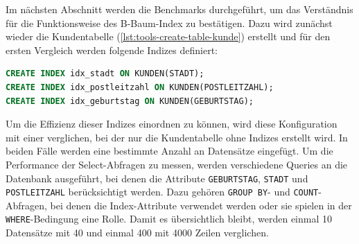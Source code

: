 Im nächsten Abschnitt werden die Benchmarks durchgeführt, um das Verständnis für die Funktionsweise des B-Baum-Index zu bestätigen.
Dazu wird zunächst wieder die Kundentabelle (\ref{lst:tools-create-table-kunde}) erstellt und für den ersten Vergleich werden folgende Indizes definiert:

\vspace{-5pt}
\begin{lstlisting}[language=SQL,caption=Definition mehrere Indizes,label={lst:indexing-create-multiple}]
CREATE INDEX idx_stadt ON KUNDEN(STADT);
CREATE INDEX idx_postleitzahl ON KUNDEN(POSTLEITZAHL);
CREATE INDEX idx_geburtstag ON KUNDEN(GEBURTSTAG);
\end{lstlisting}
\vspace{-5pt}

Um die Effizienz dieser Indizes einordnen zu können, wird diese Konfiguration mit einer verglichen, bei der nur die Kundentabelle ohne Indizes erstellt wird.
In beiden Fälle werden eine bestimmte Anzahl an Datensätze eingefügt.
Um die Performance der Select-Abfragen zu messen, werden verschiedene Queries an die Datenbank ausgeführt, bei denen die Attribute \texttt{GEBURTSTAG}, \texttt{STADT} und \texttt{POSTLEITZAHL} berücksichtigt werden.
Dazu gehören \texttt{GROUP BY}- und \texttt{COUNT}-Abfragen, bei denen die Index-Attribute verwendet werden oder sie spielen in der \texttt{WHERE}-Bedingung eine Rolle.
Damit es übersichtlich bleibt, werden einmal 10 Datensätze mit 40 und einmal 400 mit 4000 Zeilen verglichen.

